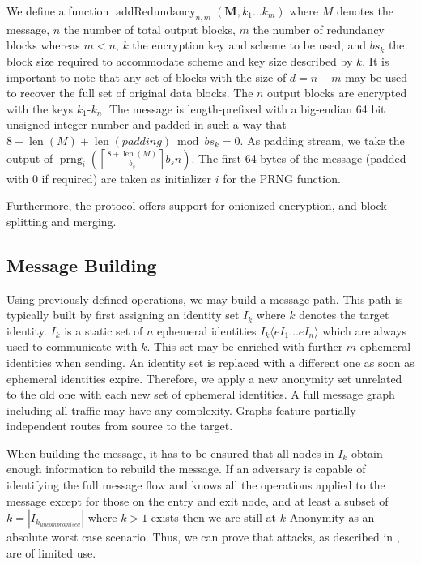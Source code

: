\documentclass[runningheads]{llncs}
\DeclareMathOperator{\prng}{prng}
\DeclareMathOperator{\len}{len}
\DeclareMathOperator{\addRedundancy}{addRedundancy}
\begin{document}
We define a function $\addRedundancy_{n,m}( \mathbf{M},k_1\ldots k_{m} )$ where $M$ denotes the message, $n$ the number of total output blocks, $m$ the number of redundancy blocks whereas $m<n$, $k$ the encryption key and scheme to be used, and $bs_k$ the block size required to accommodate scheme and key size described by $k$. It is important to note that any set of blocks with the size of $d=n-m$ may be used to recover the full set of original data blocks. The $n$ output blocks are encrypted with the keys $k_1$-$k_n$. The message is length-prefixed with a big-endian 64 bit unsigned integer number and padded in such a way that $8+\len(M)+\len(padding) \bmod bs_k =0$. As padding stream, we take the output of $\prng_i\left(\left\lceil\frac{8+\len(M)}{b_s}\right\rceil b_s n\right )$. The first 64 bytes of the message (padded with 0 if required) are taken as initializer $i$ for the PRNG function.

Furthermore, the protocol offers support for onionized encryption, and block splitting and merging.

\subsection{Message Building}
Using previously defined operations, we may build a message path. This path is typically built by first assigning an identity set $I_k$ where  $k$ denotes the target identity. $I_k$ is a static set of $n$ ephemeral identities $I_k\langle eI_1 \ldots eI_n\rangle$ which are always used to communicate with $k$. This set may be enriched with further $m$ ephemeral identities when sending. An identity set is replaced with a different one as soon as ephemeral identities expire. Therefore, we apply a new anonymity set unrelated to the old one with each new set of ephemeral identities. A full message graph including all traffic may have any complexity. Graphs feature partially independent routes from source to the target. 

When building the message, it has to be ensured that all nodes in $I_k$ obtain enough information to rebuild the message. If an adversary is capable of identifying the full message flow and knows all the operations applied to the message except for those on the entry and exit node, and at least a subset of $k=|I_{k_{uncompromised}}|$ where $k>1$ exists then we are still at $k$-Anonymity as an absolute worst case scenario. Thus, we can prove that attacks, as described in \cite{DanSer04}, are of limited use. 
\end{document}
